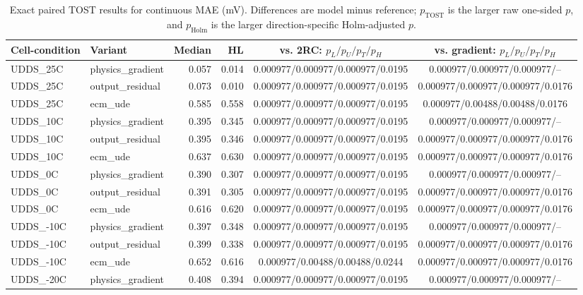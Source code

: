 \begin{table}[!t]
\centering
\footnotesize
\caption{Exact paired TOST results for continuous MAE (mV). Differences are model minus reference; $p_{\mathrm{TOST}}$ is the larger raw one-sided $p$, and $p_{\mathrm{Holm}}$ is the larger direction-specific Holm-adjusted $p$.}
\label{tab:reviewer-round2-tost}
\setlength{\tabcolsep}{3pt}
\begin{tabular}{llrrcc}
\toprule
Cell-condition & Variant & Median & HL & vs. 2RC: $p_L/p_U/p_T/p_H$ & vs. gradient: $p_L/p_U/p_T/p_H$ \\
\midrule
UDDS\_25C & physics\_gradient & 0.057 & 0.014 & 0.000977/0.000977/0.000977/0.0195 & 0.000977/0.000977/0.000977/-- \\
UDDS\_25C & output\_residual & 0.073 & 0.010 & 0.000977/0.000977/0.000977/0.0195 & 0.000977/0.000977/0.000977/0.0176 \\
UDDS\_25C & ecm\_ude & 0.585 & 0.558 & 0.000977/0.000977/0.000977/0.0195 & 0.000977/0.00488/0.00488/0.0176 \\
UDDS\_10C & physics\_gradient & 0.395 & 0.345 & 0.000977/0.000977/0.000977/0.0195 & 0.000977/0.000977/0.000977/-- \\
UDDS\_10C & output\_residual & 0.395 & 0.346 & 0.000977/0.000977/0.000977/0.0195 & 0.000977/0.000977/0.000977/0.0176 \\
UDDS\_10C & ecm\_ude & 0.637 & 0.630 & 0.000977/0.000977/0.000977/0.0195 & 0.000977/0.000977/0.000977/0.0176 \\
UDDS\_0C & physics\_gradient & 0.390 & 0.307 & 0.000977/0.000977/0.000977/0.0195 & 0.000977/0.000977/0.000977/-- \\
UDDS\_0C & output\_residual & 0.391 & 0.305 & 0.000977/0.000977/0.000977/0.0195 & 0.000977/0.000977/0.000977/0.0176 \\
UDDS\_0C & ecm\_ude & 0.616 & 0.620 & 0.000977/0.000977/0.000977/0.0195 & 0.000977/0.000977/0.000977/0.0176 \\
UDDS\_-10C & physics\_gradient & 0.397 & 0.348 & 0.000977/0.000977/0.000977/0.0195 & 0.000977/0.000977/0.000977/-- \\
UDDS\_-10C & output\_residual & 0.399 & 0.338 & 0.000977/0.000977/0.000977/0.0195 & 0.000977/0.000977/0.000977/0.0176 \\
UDDS\_-10C & ecm\_ude & 0.652 & 0.616 & 0.000977/0.00488/0.00488/0.0244 & 0.000977/0.000977/0.000977/0.0176 \\
UDDS\_-20C & physics\_gradient & 0.408 & 0.394 & 0.000977/0.000977/0.000977/0.0195 & 0.000977/0.000977/0.000977/-- \\

\end{tabular}
\end{table}
